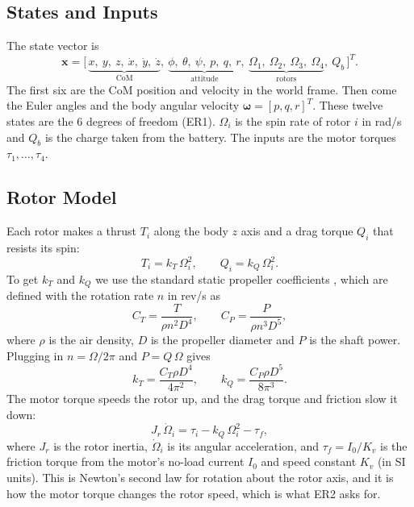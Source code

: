 \documentclass[11pt]{article}
\begin{document}
\subsection{States and Inputs}
The state vector is
\begin{equation}
\mathbf{x} = \big[\, \underbrace{x,\ y,\ z,\ \dot x,\ \dot y,\ \dot z}_{\text{CoM}},\ \underbrace{\phi,\ \theta,\ \psi,\ p,\ q,\ r}_{\text{attitude}},\ \underbrace{\Omega_1,\ \Omega_2,\ \Omega_3,\ \Omega_4}_{\text{rotors}},\ Q_b \,\big]^T .
\end{equation}
The first six are the CoM position and velocity in the world frame. Then come the Euler angles and the body angular velocity $\boldsymbol{\omega} = [p, q, r]^T$. These twelve states are the 6 degrees of freedom (ER1). $\Omega_i$ is the spin rate of rotor $i$ in rad/s and $Q_b$ is the charge taken from the battery. The inputs are the motor torques $\tau_1, \dots, \tau_4$.

\subsection{Rotor Model}
Each rotor makes a thrust $T_i$ along the body $z$ axis and a drag torque $Q_i$ that resists its spin:
\begin{equation}
T_i = k_T\,\Omega_i^2, \qquad Q_i = k_Q\,\Omega_i^2.
\end{equation}
To get $k_T$ and $k_Q$ we use the standard static propeller coefficients \cite{deters2008static}, which are defined with the rotation rate $n$ in rev/s as
\begin{equation}
C_T = \frac{T}{\rho n^2 D^4}, \qquad C_P = \frac{P}{\rho n^3 D^5},
\end{equation}
where $\rho$ is the air density, $D$ is the propeller diameter and $P$ is the shaft power. Plugging in $n = \Omega/2\pi$ and $P = Q\,\Omega$ gives
\begin{equation}
k_T = \frac{C_T \rho D^4}{4\pi^2}, \qquad k_Q = \frac{C_P \rho D^5}{8\pi^3}.
\end{equation}
The motor torque speeds the rotor up, and the drag torque and friction slow it down:
\begin{equation}
J_r\,\dot{\Omega}_i = \tau_i - k_Q\,\Omega_i^2 - \tau_f,
\label{eq:rotor}
\end{equation}
where $J_r$ is the rotor inertia, $\dot\Omega_i$ is its angular acceleration, and $\tau_f = I_0/K_v$ is the friction torque from the motor's no-load current $I_0$ and speed constant $K_v$ (in SI units). This is Newton's second law for rotation about the rotor axis, and it is how the motor torque changes the rotor speed, which is what ER2 asks for.
\end{document}
